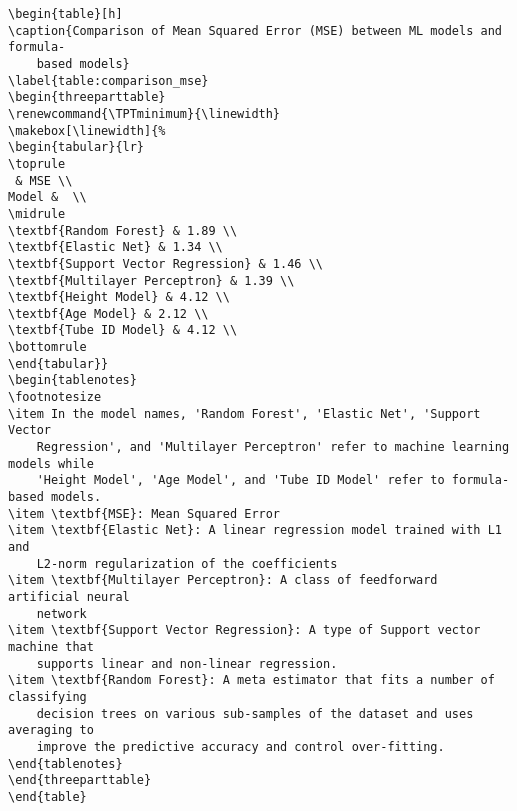 \documentclass[11pt]{article}
\begin{document}
\begin{Verbatim}[tabsize=4]
\begin{table}[h]
\caption{Comparison of Mean Squared Error (MSE) between ML models and formula-
	based models}
\label{table:comparison_mse}
\begin{threeparttable}
\renewcommand{\TPTminimum}{\linewidth}
\makebox[\linewidth]{%
\begin{tabular}{lr}
\toprule
 & MSE \\
Model &  \\
\midrule
\textbf{Random Forest} & 1.89 \\
\textbf{Elastic Net} & 1.34 \\
\textbf{Support Vector Regression} & 1.46 \\
\textbf{Multilayer Perceptron} & 1.39 \\
\textbf{Height Model} & 4.12 \\
\textbf{Age Model} & 2.12 \\
\textbf{Tube ID Model} & 4.12 \\
\bottomrule
\end{tabular}}
\begin{tablenotes}
\footnotesize
\item In the model names, 'Random Forest', 'Elastic Net', 'Support Vector
	Regression', and 'Multilayer Perceptron' refer to machine learning models while
	'Height Model', 'Age Model', and 'Tube ID Model' refer to formula-based models.
\item \textbf{MSE}: Mean Squared Error
\item \textbf{Elastic Net}: A linear regression model trained with L1 and
	L2-norm regularization of the coefficients
\item \textbf{Multilayer Perceptron}: A class of feedforward artificial neural
	network
\item \textbf{Support Vector Regression}: A type of Support vector machine that
	supports linear and non-linear regression.
\item \textbf{Random Forest}: A meta estimator that fits a number of classifying
	decision trees on various sub-samples of the dataset and uses averaging to
	improve the predictive accuracy and control over-fitting.
\end{tablenotes}
\end{threeparttable}
\end{table}

\end{Verbatim}




\end{document}
